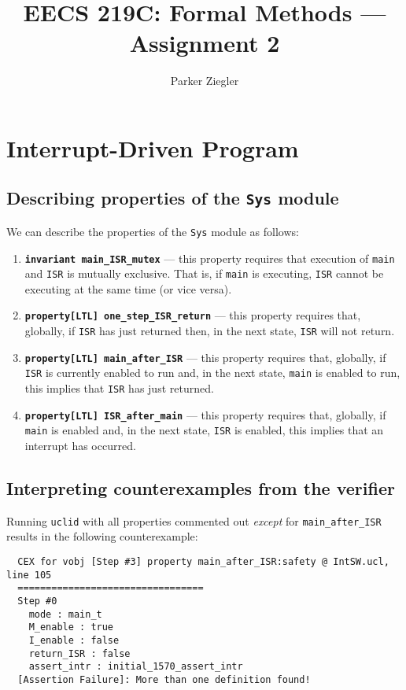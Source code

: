 \documentclass{article}
\title{EECS 219C: Formal Methods — Assignment 2}
\author{Parker Ziegler}
\newcommand{\code}[1]{\texttt{#1}}
\begin{document}
\maketitle

\section{Interrupt-Driven Program}

\subsection{Describing properties of the \code{Sys} module}

We can describe the properties of the \code{Sys} module as follows:

\begin{enumerate}
  \item \textbf{\code{invariant main\_ISR\_mutex}} — this property requires that execution of \code{main} and \code{ISR} is mutually exclusive. That is, if \code{main} is executing, \code{ISR} cannot be executing at the same time (or vice versa).
  \item \textbf{\code{property[LTL] one\_step\_ISR\_return}} — this property requires that, globally, if \code{ISR} has just returned then, in the next state, \code{ISR} will not return.
  \item \textbf{\code{property[LTL] main\_after\_ISR}} — this property requires that, globally, if \code{ISR} is currently enabled to run and, in the next state, \code{main} is enabled to run, this implies that \code{ISR} has just returned.
  \item \textbf{\code{property[LTL] ISR\_after\_main}} — this property requires that, globally, if \code{main} is enabled and, in the next state, \code{ISR} is enabled, this implies that an interrupt has occurred.
\end{enumerate}

\subsection{Interpreting counterexamples from the verifier}

Running \code{uclid} with all properties commented out \emph{except} for \code{main\_after\_ISR} results in the following counterexample:

\begin{lstlisting}
  CEX for vobj [Step #3] property main_after_ISR:safety @ IntSW.ucl, line 105
  =================================
  Step #0
    mode : main_t
    M_enable : true
    I_enable : false
    return_ISR : false
    assert_intr : initial_1570_assert_intr
  [Assertion Failure]: More than one definition found!
\end{lstlisting}
\end{document}
